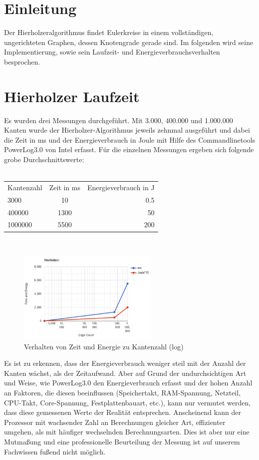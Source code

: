 \section{Einleitung}

Der Hierholzeralgorithmus findet Eulerkreise in einem vollständigen, ungerichteten Graphen, dessen Knotengrade gerade sind. Im folgenden wird seine Implementierung, sowie sein Laufzeit- und Energieverbrauchsverhalten besprochen.

\section{Hierholzer Laufzeit}

Es wurden drei Messungen durchgeführt. Mit 3.000, 400.000 und 1.000.000 Kanten wurde der Hierholzer-Algorithmus jeweils zehnmal ausgeführt und dabei die Zeit in ms und der Energieverbrauch in Joule mit Hilfe des Commandlinetools PowerLog3.0 von Intel erfasst. Für die einzelnen Messungen ergeben sich folgende grobe Durchschnittswerte:\\
\\
\begin{tabular}[h]{lcr}
Kantenzahl & Zeit in ms & Energieverbrauch in J \\
3000 & 10 & 0.5 \\
400000 & 1300 & 50 \\
1000000 & 5500 & 200 \\
\end{tabular}
\\

\begin{figure}[htbp]
	\centering
		\includegraphics[width=0.6\textwidth]{Latex/Figs/TimeEnergyChart.png}		
	\caption{Verhalten von Zeit und Energie zu Kantenzahl (log)}
	\label{fig:TimeEnergyChart}
\end{figure}

Es ist zu erkennen, dass der Energieverbrauch weniger steil mit der Anzahl der Kanten wächst, als der Zeitaufwand. Aber auf Grund der undurchsichtigen Art und Weise, wie PowerLog3.0 den Energieverbrauch erfasst und der hohen Anzahl an Faktoren, die diesen beeinflussen (Speichertakt, RAM-Spannung, Netzteil, CPU-Takt, Core-Spannung, Festplattenbauart, etc.), kann nur vermutet werden, dass diese gemessenen Werte der Realität entsprechen. Anscheinend kann der Prozessor mit wachsender Zahl an Berechnungen gleicher Art, effizienter umgehen, als mit häufiger wechselnden Berechnungsarten. Dies ist aber nur eine Mutmaßung und eine professionelle Beurteilung der Messung ist auf unserem Fachwissen fußend nicht möglich.\\


